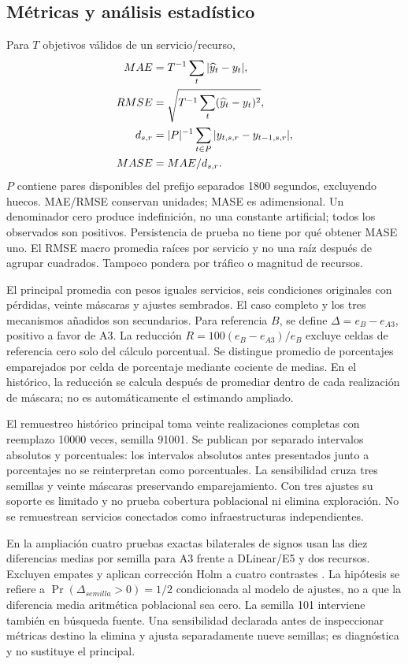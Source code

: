 \subsection{Métricas y análisis estadístico}
Para $ T $ objetivos válidos de un servicio/recurso,
\begin{align}
MAE&=T^{-1}\sum_t|\widehat y_t-y_t|,\notag\\
RMSE&=\sqrt{T^{-1}\sum_t(\widehat y_t-y_t)^2},\\
d_{s,r}&=|P|^{-1}\sum_{t\in P}|y_{t,s,r}-y_{t-1,s,r}|,\notag\\
MASE&=MAE/d_{s,r}.
\end{align}
$ P $ contiene pares disponibles del prefijo separados 1800 segundos, excluyendo huecos. MAE/RMSE conservan unidades; MASE es adimensional. Un denominador cero produce indefinición, no una constante artificial; todos los observados son positivos. Persistencia de prueba no tiene por qué obtener MASE uno. El RMSE macro promedia raíces por servicio y no una raíz después de agrupar cuadrados. Tampoco pondera por tráfico o magnitud de recursos.

El principal promedia con pesos iguales servicios, seis condiciones originales con pérdidas, veinte máscaras y ajustes sembrados. El caso completo y los tres mecanismos añadidos son secundarios. Para referencia $ B $, se define $\Delta=e_B-e_{A3}$, positivo a favor de A3. La reducción $ R=100(e_B-e_{A3})/e_B $ excluye celdas de referencia cero solo del cálculo porcentual. Se distingue promedio de porcentajes emparejados por celda de porcentaje mediante cociente de medias. En el histórico, la reducción se calcula después de promediar dentro de cada realización de máscara; no es automáticamente el estimando ampliado.

El remuestreo histórico principal toma veinte realizaciones completas con reemplazo 10000 veces, semilla 91001. Se publican por separado intervalos absolutos y porcentuales: los intervalos absolutos antes presentados junto a porcentajes no se reinterpretan como porcentuales. La sensibilidad cruza tres semillas y veinte máscaras preservando emparejamiento. Con tres ajustes su soporte es limitado y no prueba cobertura poblacional ni elimina exploración. No se remuestrean servicios conectados como infraestructuras independientes.

En la ampliación cuatro pruebas exactas bilaterales de signos usan las diez diferencias medias por semilla para A3 frente a DLinear/E5 y dos recursos. Excluyen empates y aplican corrección Holm a cuatro contrastes \cite{holm}. La hipótesis se refiere a $\Pr(\Delta_{semilla}>0)=1/2$ condicionada al modelo de ajustes, no a que la diferencia media aritmética poblacional sea cero. La semilla 101 interviene también en búsqueda fuente. Una sensibilidad declarada antes de inspeccionar métricas destino la elimina y ajusta separadamente nueve semillas; es diagnóstica y no sustituye el principal.

